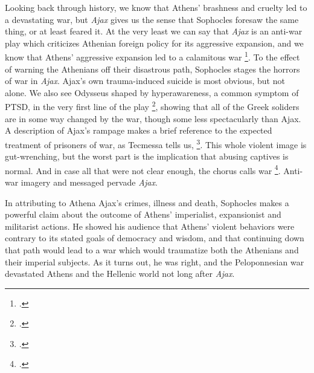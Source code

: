 

Looking back through history, we know that Athens' brashness and cruelty led to a
devastating war, but \textit{Ajax} gives us the sense that Sophocles foresaw the same
thing, or at least feared it. At the very least we can say that \textit{Ajax} is an
anti-war play which criticizes Athenian foreign policy for its aggressive expansion, and
we know that Athens' aggressive expansion led to a calamitous war \footcite[ch. 1.23
ll. 1--2]{thucydides_war}. To the effect of warning the Athenians off their disastrous
path, Sophocles stages the horrors of war in \textit{Ajax}. Ajax's own trauma-induced
suicide is most obvious, but not alone. We also see Odysseus shaped by hyperawareness, a
common symptom of PTSD, in the very first line of the play \footcite[l. 1]{ajax}, showing
that all of the Greek soliders are in some way changed by the war, though some less
spectacularly than Ajax. A description of Ajax's rampage makes a brief reference to the
expected treatment of prisoners of war, as Tecmessa tells us,  \footcite[ll. 295--300]{ajax}.
This whole violent image is gut-wrenching, but the worst part is the implication that
abusing captives is normal. And in case all that were not clear enough, the chorus calls
war 
\footcite[ll. 1192--1197]{ajax}. Anti-war imagery and messaged pervade \textit{Ajax}.



In attributing to Athena Ajax's crimes, illness and death, Sophocles makes a powerful
claim about the outcome of Athens' imperialist, expansionist and militarist actions. He
showed his audience that Athens' violent behaviors were contrary to its stated goals of
democracy and wisdom, and that continuing down that path would lead to a war which would
traumatize both the Athenians and their imperial subjects. As it turns out, he was right,
and the Peloponnesian war devastated Athens and the Hellenic world not long after
\textit{Ajax}.
